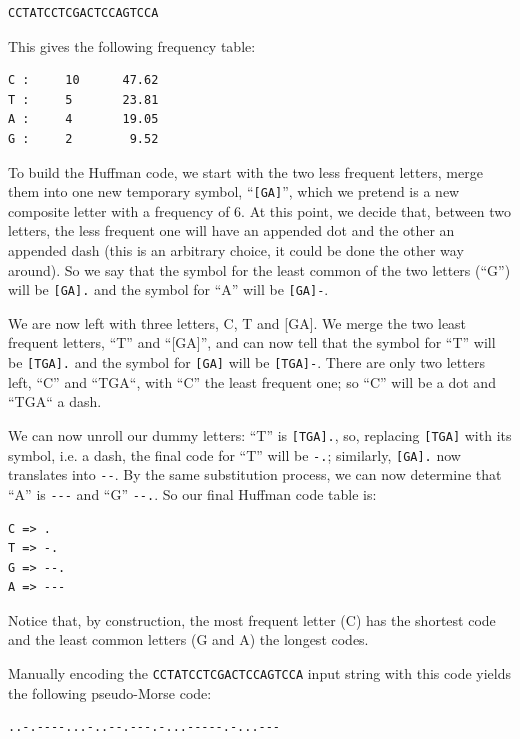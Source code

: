 \begin{verbatim}
CCTATCCTCGACTCCAGTCCA
\end{verbatim}

This gives the following frequency table:

\begin{verbatim}
C :     10      47.62
T :     5       23.81
A :     4       19.05
G :     2        9.52
\end{verbatim}

To build the Huffman code, we start with the two less frequent 
letters, merge them into one new temporary symbol, ``\verb"[GA]"'', 
which we pretend is a new composite letter with a 
frequency of 6. At this point, we decide that, between two letters, 
the less frequent one will have an appended dot and the other 
an appended dash (this is an arbitrary choice, it could be done 
the other way around). So we say that the symbol for the least 
common of the two letters (``G'') will be \verb'[GA].' and the 
symbol for ``A'' will be \verb'[GA]-'. 

We are now left with three letters, C, T and [GA]. We merge the 
two least frequent letters, ``T'' and ``[GA]'', and can now tell 
that the symbol for ``T'' will be \verb'[TGA].' and the symbol for 
\verb'[GA]' will be \verb'[TGA]-'. There are only two letters left, 
``C'' and ``TGA``, with ``C'' the least frequent one; so ``C'' will 
be a dot and ``TGA`` a dash. 

We can now unroll our dummy letters: ``T'' is \verb'[TGA].', so, 
replacing \verb'[TGA]' with its symbol, i.e. a dash, the 
final code for ``T'' will be \verb'-.'; similarly, \verb'[GA].' 
now translates into \verb'--'. By the same substitution process, 
we can now determine that ``A'' is \verb'---' and ``G'' 
\verb'--.'. So our final Huffman code table is:

\begin{verbatim}
C => .
T => -.
G => --.
A => ---
\end{verbatim}

Notice that, by construction, the most frequent letter (C) 
has the shortest code and the least common letters (G and A) 
the longest codes.

Manually encoding the \verb'CCTATCCTCGACTCCAGTCCA' input string 
with this code yields the following pseudo-Morse code:

\begin{verbatim}
..-.----...-..--.---.-...-----.-...---
\end{verbatim}

